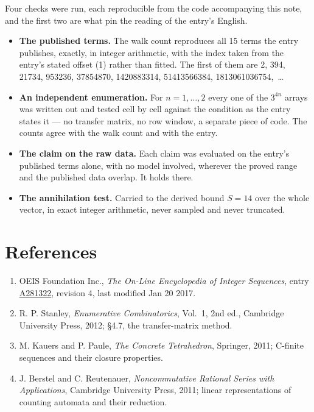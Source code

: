\documentclass[11pt]{article}
\theoremstyle{definition}
\begin{document}
Four checks were run, each reproducible from the code accompanying this note, and the first two are what pin the reading of the entry's English.

\begin{itemize}

\item {\bfseries The published terms.} The walk count reproduces all 15 terms the entry publishes, exactly, in integer arithmetic, with the index taken from the entry's stated offset (1) rather than fitted. The first of them are 2, 394, 21734, 953236, 37854870, 1420883314, 51413566384, 1813061036754,~\dots

\item {\bfseries An independent enumeration.} For $n = 1,\dots,2$ every one of the $3^{4n}$ arrays was written out and tested cell by cell against the condition as the entry states it --- no transfer matrix, no row window, a separate piece of code. The counts agree with the walk count and with the entry.

\item {\bfseries The claim on the raw data.} Each claim was evaluated on the entry's published terms alone, with no model involved, wherever the proved range and the published data overlap. It holds there.

\item {\bfseries The annihilation test.} Carried to the derived bound $S = 14$ over the whole vector, in exact integer arithmetic, never sampled and never truncated.

\end{itemize}

\section{References}

\begin{enumerate}

\item OEIS Foundation Inc., \emph{The On-Line Encyclopedia of Integer Sequences}, entry \href{https://oeis.org/A281322}{A281322}, revision 4, last modified Jan 20 2017.

\item R. P. Stanley, \emph{Enumerative Combinatorics}, Vol.~1, 2nd ed., Cambridge University Press, 2012; \S4.7, the transfer-matrix method.

\item M. Kauers and P. Paule, \emph{The Concrete Tetrahedron}, Springer, 2011; C-finite sequences and their closure properties.

\item J. Berstel and C. Reutenauer, \emph{Noncommutative Rational Series with Applications}, Cambridge University Press, 2011; linear representations of counting automata and their reduction.

\end{enumerate}
\end{document}
